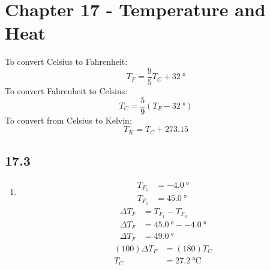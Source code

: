 \documentclass{article}
\begin{document}
\newcommand{\hr}{\par\noindent\rule{\textwidth}{0.4pt}}

\newcommand{\bc}[1]{
	\begin{equation*}
		\begin{boxed}
			{#1}
		\end{boxed}
	\end{equation*}
}

\newcommand{\cond}[2]{
	\ifmmode
		{#1} \quad {#2}
	\else
		$$ {#1} \quad {#2} $$
	\fi
}

\newcommand{\matr}[1]{
	\ifmmode \bm{#1}
	\else \textit{\textbf{#1}}
	\fi
}
\newcommand{\vect}[1]{
	\ifmmode \mathbf{#1}
	\else \textbf{#1}
	\fi
}


\newcommand{\boldalph}{\textbf{(\alph*)}}

\tableofcontents

\section{Chapter 17 - Temperature and Heat}

To convert Celsius to Fahrenheit:
\begin{equation}
	T_F = \frac{9}{5}T_C + \SI{32}{\degree}
\end{equation}
To convert Fahrenheit to Celsius:
\begin{equation}
	T_C = \frac{5}{9}(T_F - \SI{32}{\degree})
\end{equation}
To convert from Celsius to Kelvin:
\begin{equation}
	T_K = T_C + 273.15
\end{equation}

\subsection{17.3}

\begin{enumerate}[label = \textbf{(\alph*)}]
	\item
		\begin{align*}
			T_{F_0} & = \SI{-4.0}{\degree} \\
			T_{F_1} & = \SI{45.0}{\degree}
		\end{align*}
		\begin{align*}
			\Delta T_F & = T_{F_1} - T_{F_0} \\
			\Delta T_F & = \SI{45.0}{\degree} - \SI{-4.0}{\degree} \\
			\Delta T_F & = \SI{49.0}{\degree}
		\end{align*}
		\begin{align*}
			(100)\Delta T_F & = (180)T_C \\
			T_C & = \SI{27.2}{\celsius}
		\end{align*}
\end{enumerate}
\end{document}
